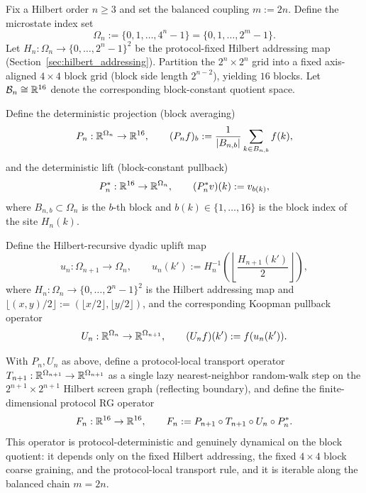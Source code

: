\begin{definition}
\label{def:balanced_chain_block_quotient}
\InterfaceTag Fix a Hilbert order $n\ge 3$ and set the balanced coupling $m:=2n$.
Define the microstate index set
\[
\Omega_n:=\{0,1,\dots,4^n-1\}=\{0,1,\dots,2^m-1\}.
\]
Let $H_n:\Omega_n\to\{0,\dots,2^n-1\}^2$ be the protocol-fixed Hilbert addressing map (Section~\ref{sec:hilbert_addressing}).
Partition the $2^n\times 2^n$ grid into a fixed axis-aligned $4\times 4$ block grid (block side length $2^{n-2}$), yielding $16$ blocks.
Let $\mathcal{B}_n\cong\mathbb{R}^{16}$ denote the corresponding block-constant quotient space.

Define the deterministic projection (block averaging)
\[
P_n:\mathbb{R}^{\Omega_n}\to\mathbb{R}^{16},
\qquad
(P_nf)_b:=\frac{1}{|B_{n,b}|}\sum_{k\in B_{n,b}} f(k),
\]
and the deterministic lift (block-constant pullback)
\[
P_n^\ast:\mathbb{R}^{16}\to\mathbb{R}^{\Omega_n},
\qquad
(P_n^\ast v)(k):=v_{b(k)},
\]
where $B_{n,b}\subset\Omega_n$ is the $b$-th block and $b(k)\in\{1,\dots,16\}$ is the block index of the site $H_n(k)$.
\end{definition}

\begin{definition}\label{def:dyadic_uplift_koopman}
\InterfaceTag Define the Hilbert-recursive dyadic uplift map
\[
u_n:\Omega_{n+1}\to\Omega_n,
\qquad
u_n(k'):=H_n^{-1}\!\left(\left\lfloor \frac{H_{n+1}(k')}{2}\right\rfloor\right),
\]
where $H_n:\Omega_n\to \{0,\dots,2^n-1\}^2$ is the Hilbert addressing map and
$\lfloor(x,y)/2\rfloor:=(\lfloor x/2\rfloor,\lfloor y/2\rfloor)$,
and the corresponding Koopman pullback operator
\[
U_n:\mathbb{R}^{\Omega_n}\to\mathbb{R}^{\Omega_{n+1}},
\qquad
(U_nf)(k'):=f(u_n(k')).
\]
\end{definition}

\begin{definition}\label{def:protocol_rg_operator_Fn}
\InterfaceTag With $P_n,U_n$ as above, define a protocol-local transport operator $T_{n+1}:\mathbb{R}^{\Omega_{n+1}}\to\mathbb{R}^{\Omega_{n+1}}$ as a single lazy nearest-neighbor random-walk step on the $2^{n+1}\times 2^{n+1}$ Hilbert screen graph (reflecting boundary), and define the finite-dimensional protocol RG operator
\[
F_n:\mathbb{R}^{16}\to\mathbb{R}^{16},
\qquad
F_n:=P_{n+1}\circ T_{n+1}\circ U_n\circ P_n^\ast.
\]
This operator is protocol-deterministic and genuinely dynamical on the block quotient: it depends only on the fixed Hilbert addressing, the fixed $4\times 4$ block coarse graining, and the protocol-local transport rule, and it is iterable along the balanced chain $m=2n$.
\end{definition}

